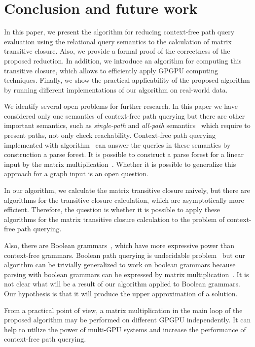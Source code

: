 \section{Conclusion and future work}
In this paper, we present the algorithm for reducing context-free path query evaluation using the relational query semantics to the calculation of matrix transitive closure. Also, we provide a formal proof of the correctness of the proposed reduction. In addition, we introduce an algorithm for computing this transitive closure, which allows to efficiently apply GPGPU computing techniques. Finally, we show the practical applicability of the proposed algorithm by running different implementations of our algorithm on real-world data.

We identify several open problems for further research. In this paper we have considered only one semantics of context-free path querying but there are other important semantics, such as \textit{single-path} and \textit{all-path} semantics~\cite{hellingsPathQuerying} which require to present paths, not only check reachability. Context-free path querying implemented with algorithm~\cite{GLL} can answer the queries in these semantics by construction a parse forest. It is possible to construct a parse forest for a linear input by the matrix multiplication~\cite{okhotin_cyk}. Whether it is possible to generalize this approach for a graph input is an open question.

In our algorithm, we calculate the matrix transitive closure naively, but there are algorithms for the transitive closure calculation, which are asymptotically more efficient. Therefore, the question is whether it is possible to apply these algorithms for the matrix transitive closure calculation to the problem of context-free path querying.

Also, there are Boolean grammars~\cite{okhotinBoolean}, which have more expressive power than context-free grammars. Boolean path querying is undecidable problem~\cite{hellingsRelational} but our algorithm can be trivially generalized to work on boolean grammars because parsing with boolean grammars can be expressed by matrix multiplication~\cite{okhotin_cyk}. It is not clear what will be a result of our algorithm applied to Boolean grammars. Our hypothesis is that it will produce the upper approximation of a solution.

From a practical point of view, a matrix multiplication in the main loop of the proposed algorithm may be performed on different GPGPU independently. It can help to utilize the power of multi-GPU systems and increase the performance of context-free path querying.